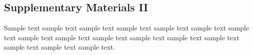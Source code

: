 \documentclass[11pt]{uonthesis}
\begin{document}
\begin{appendices}
\chapter{Supplementary Materials II}

Sample text sample text sample text sample text sample text sample
text sample text sample text sample text sample text sample text
sample text sample text sample text sample text sample text.

\end{appendices}
\end{document}

